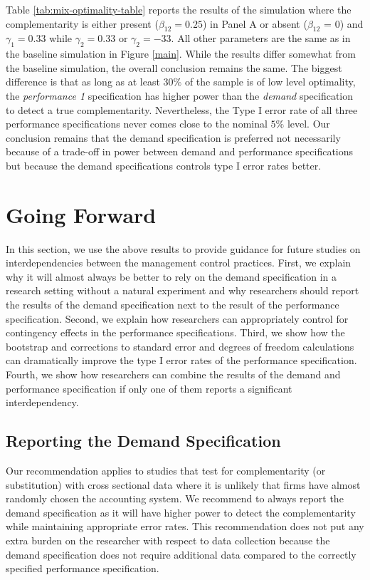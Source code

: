 \documentclass[12pt]{article}
\begin{document}


Table \ref{tab:mix-optimality-table} reports the results of the simulation where the complementarity is either present ($\beta_{12} = 0.25$) in Panel A or absent ($\beta_{12}$ = 0) and $\gamma_1 = 0.33$ while $\gamma_2 = 0.33$ or $\gamma_2 = -33$. All other parameters are the same as in the baseline simulation in Figure \ref{main}. While the results differ somewhat from the baseline simulation, the overall conclusion remains the same. The biggest difference is that as long as at least $30\%$ of the sample is of low level optimality, the \emph{performance 1} specification has higher power than the \emph{demand} specification to detect a true complementarity. Nevertheless, the Type I error rate of all three performance specifications never comes close to the nominal $5\%$ level. Our conclusion remains that the demand specification is preferred not necessarily because of a trade-off in power between demand and performance specifications but because the demand specifications controls type I error rates better.


\section{Going Forward}

In this section, we use the above results to provide guidance for future studies on interdependencies between the management control practices. First, we explain why it will almost always be better to rely on the demand specification in a research setting without a natural experiment and why researchers should report the results of the demand specification next to the result of the performance specification. Second, we explain how researchers can appropriately control for contingency effects in the performance specifications. Third, we show how the bootstrap and corrections to standard error and degrees of freedom calculations can dramatically improve the type I error rates of the performance specification. Fourth, we show how researchers can combine the results of the demand and performance specification if only one of them reports a significant interdependency.

\subsection{Reporting the Demand Specification}

Our recommendation applies to studies that test for complementarity (or substitution) with cross sectional data where it is unlikely that firms have almost randomly chosen the accounting system. We recommend to always report the demand specification as it will have higher power to detect the complementarity while maintaining appropriate error rates. This recommendation does not put any extra burden on the researcher with respect to data collection because the demand specification does not require additional data compared to the correctly specified performance specification. 
\end{document}
